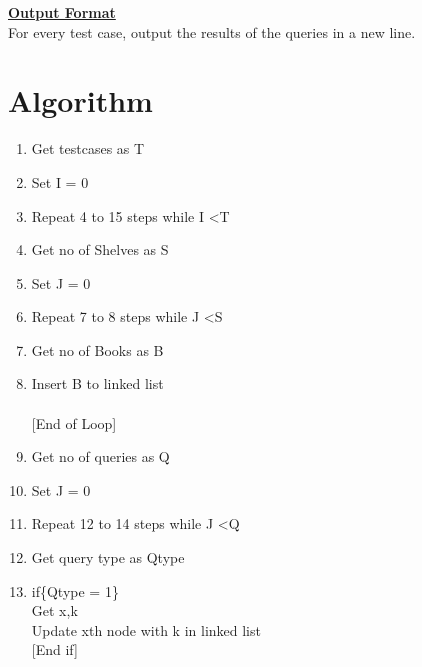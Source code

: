 \documentclass[a4paper,12pt]{article}
\begin{document}
\underline{ \textbf{Output Format} } 
\\For every test case, output the results of the queries in a new line.


        \newpage
\section*{Algorithm}

\begin{enumerate}[Step 1:]
\item Get testcases as T
\item Set I = 0
\item Repeat 4 to 15 steps while I \textless T
\item  \hspace*{10mm} Get no of Shelves as S
\item  \hspace*{10mm} Set J = 0
\item \hspace*{10mm} Repeat 7 to 8 steps while J \textless S
\item \hspace*{15mm}    Get no of Books as B
\item \hspace*{15mm}    {\color{blue}Insert} B to linked list\\
\\ \hspace*{11mm}       [End of Loop]
\item \hspace*{10mm}Get no of queries as Q
\item \hspace*{10mm} Set J = 0
\item \hspace*{10mm}Repeat 12 to 14 steps while J \textless Q
\item \hspace*{15mm} Get query type as Qtype
\item \hspace*{15mm} if\{Qtype = 1\}\\
\hspace*{21mm}           Get x,k\\
\hspace*{21mm}          {\color{blue}Update}  xth node with k in linked list\\
\hspace*{21mm}      [End if]

\end{enumerate}
\end{document}
